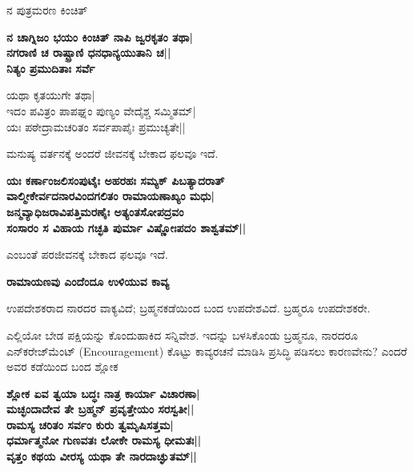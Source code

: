 \begin{center} 

ನ ಪುತ್ರಮರಣ ಕಿಂಚಿತ್‍\\ 

{\bf ನ ಚಾಗ್ನಿಜಂ ಭಯಂ ಕಿಂಚಿತ್‍ ನಾಪಿ ಜ್ವರಕೃತಂ ತಥಾ|\\ 

ನಗರಾಣಿ ಚ ರಾಷ್ಟ್ರಾಣಿ ಧನಧಾನ್ಯಯುತಾನಿ ಚ||\\ 

ನಿತ್ಯಂ ಪ್ರಮುದಿತಾಃ ಸರ್ವೆ

ಯಥಾ ಕೃತಯುಗೇ ತಥಾ|\\ 

ಇದಂ ಪವಿತ್ರಂ ಪಾಪಘ್ನಂ ಪುಣ್ಯಂ ವೇದೈಶ್ಚ ಸಮ್ಮಿತಮ್‍|\\ 

ಯಃ ಪಠೇದ್ರಾಮಚರಿತಂ ಸರ್ವಪಾಪೈಃ ಪ್ರಮುಚ್ಯತೇ||} 

\end{center} 


ಮನುಷ್ಯ ವರ್ತನಕ್ಕೆ ಅಂದರೆ ಜೀವನಕ್ಕೆ ಬೇಕಾದ ಫಲವೂ ಇದೆ. 


\begin{center} 

{\bf ಯಃ ಕರ್ಣಾಂಜಲಿಸಂಪುಟೈಃ ಅಹರಹಃ ಸಮ್ಯಕ್‍ ಪಿಬತ್ಯಾದರಾತ್‍\\ 

ವಾಲ್ಮೀಕೇರ್ವದನಾರವಿಂದಗಲಿತಂ ರಾಮಾಯಣಾಖ್ಯಂ ಮಧು|\\ 

ಜನ್ಮವ್ಯಾಧಿಜರಾವಿಪತ್ತಿಮರಣೈಃ ಅತ್ಯಂತಸೋಪದ್ರವಂ\\ 

ಸಂಸಾರಂ ಸ ವಿಹಾಯ ಗಚ್ಛತಿ ಪುರ್ಮಾ ವಿಷ್ಣೋಃಪದಂ ಶಾಶ್ವತಮ್‍||} 

\end{center} 


ಎಂಬಂತೆ ಪರಜೀವನಕ್ಕೆ ಬೇಕಾದ ಫಲವೂ ಇದೆ. 


{\bf ರಾಮಾಯಣವು ಎಂದೆಂದೂ ಉಳಿಯುವ ಕಾವ್ಯ} 


ಉಪದೇಶಕರಾದ ನಾರದರ ವಾಕ್ಯವಿದೆ; ಬ್ರಹ್ಮನಕಡೆಯಿಂದ ಬಂದ ಉಪದೇಶವಿದೆ. ಬ್ರಹ್ಮರೂ ಉಪದೇಶಕರೇ. 


ಎಲ್ಲಿಯೋ ಬೇಡ ಪಕ್ಷಿಯನ್ನು ಕೊಂದುಹಾಕಿದ ಸನ್ನಿವೇಶ. ಇದನ್ನು ಬಳಸಿಕೊಂಡು ಬ್ರಹ್ಮನೂ, ನಾರದರೂ ಎನ್‍ಕರೇಜ್‍ಮೆಂಟ್‍ {\rm (Encouragement)} ಕೊಟ್ಟು ಕಾವ್ಯರಚನೆ ಮಾಡಿಸಿ ಪ್ರಸಿದ್ಧಿ ಪಡಿಸಲು ಕಾರಣವೇನು? ಎಂದರೆ ಅವರ ಕಡೆಯಿಂದ ಬಂದ ಶ್ಲೋಕ 


\begin{center} 

{\bf ಶ್ಲೋಕ ಏವ ತ್ವಯಾ ಬದ್ಧಃ ನಾತ್ರ ಕಾರ್ಯಾ ವಿಚಾರಣಾ|\\ 

ಮಚ್ಛಂದಾದೇವ ತೇ ಬ್ರಹ್ಮನ್‍ ಪ್ರವೃತ್ತೇಯಂ ಸರಸ್ವತೀ||\\ 

ರಾಮಸ್ಯ ಚರಿತಂ ಸರ್ವಂ ಕುರು ತ್ವಮೃಷಿಸತ್ತಮ|\\ 

ಧರ್ಮಾತ್ಮನೋ ಗುಣವತಃ ಲೋಕೇ ರಾಮಸ್ಯ ಧೀಮತಃ||\\ 

ವೃತ್ತಂ ಕಥಯ ವೀರಸ್ಯ ಯಥಾ ತೇ ನಾರದಾಚ್ಘುತಮ್‍||} 

\end{center} 


